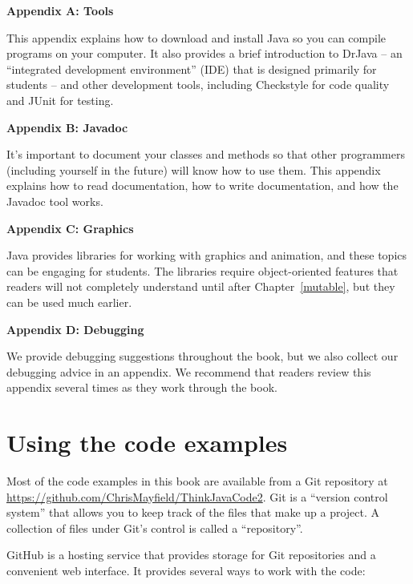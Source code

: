 \begin{description}

\item{\bf Appendix A: Tools}

This appendix explains how to download and install Java so you can compile programs on your computer.
It also provides a brief introduction to DrJava -- an ``integrated development environment'' (IDE) that is designed primarily for students -- and other development tools, including Checkstyle for code quality and JUnit for testing.

\item{\bf Appendix B: Javadoc}

It's important to document your classes and methods so that other programmers (including yourself in the future) will know how to use them.
This appendix explains how to read documentation, how to write documentation, and how the Javadoc tool works.

\item{\bf Appendix C: Graphics}

Java provides libraries for working with graphics and animation, and these topics can be engaging for students.
The libraries require object-oriented features that readers will not completely understand until after Chapter~\ref{mutable}, but they can be used much earlier.

\item{\bf Appendix D: Debugging}

We provide debugging suggestions throughout the book, but we also collect our debugging advice in an appendix.
We recommend that readers review this appendix several times as they work through the book.

\end{description}


\section*{Using the code examples}
\label{code}

Most of the code examples in this book are available from a Git repository at \url{https://github.com/ChrisMayfield/ThinkJavaCode2}.
Git is a ``version control system'' that allows you to keep track of the files that make up a project.
A collection of files under Git's control is called a ``repository''.


GitHub is a hosting service that provides storage for Git repositories and a convenient web interface.
It provides several ways to work with the code:

